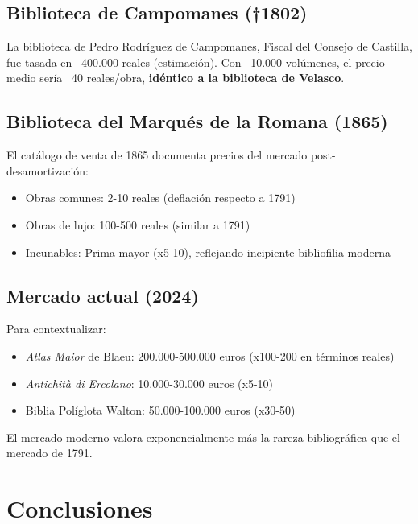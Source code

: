 \documentclass[12pt,a4paper]{article}
\begin{document}
\subsection{Biblioteca de Campomanes (†1802)}

La biblioteca de Pedro Rodríguez de Campomanes, Fiscal del Consejo de Castilla, fue tasada en ~400.000 reales (estimación). Con ~10.000 volúmenes, el precio medio sería ~40 reales/obra, \textbf{idéntico a la biblioteca de Velasco}.

\subsection{Biblioteca del Marqués de la Romana (1865)}

El catálogo de venta de 1865 documenta precios del mercado post-desamortización:
\begin{itemize}
    \item Obras comunes: 2-10 reales (deflación respecto a 1791)
    \item Obras de lujo: 100-500 reales (similar a 1791)
    \item Incunables: Prima mayor (x5-10), reflejando incipiente bibliofilia moderna
\end{itemize}

\subsection{Mercado actual (2024)}

Para contextualizar:
\begin{itemize}
    \item \textit{Atlas Maior} de Blaeu: 200.000-500.000 euros (x100-200 en términos reales)
    \item \textit{Antichità di Ercolano}: 10.000-30.000 euros (x5-10)
    \item Biblia Políglota Walton: 50.000-100.000 euros (x30-50)
\end{itemize}

El mercado moderno valora exponencialmente más la rareza bibliográfica que el mercado de 1791.

\section{Conclusiones}
\end{document}
